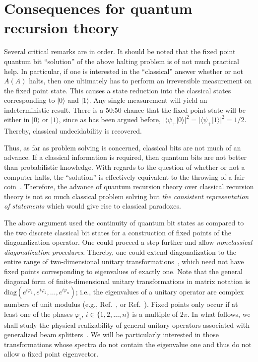 \documentclass[prl,amsfonts,amsmath,showpacs,showkeys,preprint]{revtex4}
\begin{document}
\section{Consequences for quantum recursion theory}

Several critical remarks are in order.
It should be noted that the fixed point quantum bit ``solution''
of the above halting problem is of not much practical help.
In particular, if one is interested in the ``classical'' answer whether
or not $A(A)$ halts,  then one ultimately has to perform an
irreversible measurement
on the fixed point state. This  causes a state reduction into the
classical states corresponding to $\vert 0 \rangle$ and $\vert 1 \rangle$.
Any single measurement will yield an indeterministic result.
There is a 50:50 chance that
the fixed point state will be either in $\vert 0 \rangle$ or $\vert 1 \rangle$, since as has been argued before,
$\vert \langle \psi_+ \vert 0\rangle \vert^2=\vert \langle \psi_+ \vert 1\rangle \vert^2= 1/2$.
Thereby, classical undecidability is recovered.

Thus, as far as problem solving is concerned, classical bits are not much of an
advance. If a classical information is required, then quantum bits are not
better than probabilistic knowledge. With regards to the question of
whether or not a computer halts, the ``solution''
is effectively equivalent to the throwing of a fair coin~\cite{diaconis:211}.
Therefore, the advance of quantum recursion theory over classical
recursion theory is not so much classical problem solving but {\em the
consistent representation of statements} which would give rise to
classical paradoxes.

The above argument used the continuity of quantum bit states as compared to the
two discrete classical bit states for a construction of fixed points of the
diagonalization operator. One could proceed a step further and allow
{\em nonclassical diagonalization procedures}. Thereby, one could extend diagonalization to
the entire range of two-dimensional unitary transformations~\cite{murnaghan},
which need not have fixed points corresponding to eigenvalues of exactly one.
Note that the general diagonal form of finite-dimensional unitary transformations
in matrix notation is $\text{diag}(e^{i\varphi_1},e^{i\varphi_2}, \ldots, e^{i\varphi_n})$;
i.e., the eigenvalues of a unitary operator are complex numbers of unit modulus (e.g., Ref.~\cite[p.~39]{b5.171}, or Ref.~\cite[p.~161]{halmos-vs}).
Fixed points only occur if at least one of the phases $\varphi_i$, $i\in \{1, 2,\ldots ,n\}$ is a multiple of $2\pi$.
In what follows, we shall study the physical realizability of general unitary operators associated with
generalized beam splitters~\cite{rzbb,reck-94,zukowski-97,svozil-2004-analog}.
We will be particularly interested in those transformations whose spectra do not contain the eigenvalue one
and thus do not allow a fixed point eigenvector.
\end{document}
